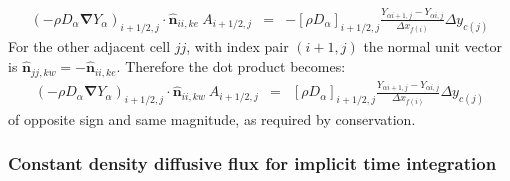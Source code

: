 \documentclass[12pt]{article}
\begin{document}
%
\begin{eqnarray}
   \left( - \rho D_\alpha \boldsymbol{\nabla} Y_\alpha \right)_{i+1/2,j} \cdot \hat{\mathbf{n}}_{ii,ke} \: A_{i+1/2,j} & = &  
   -[\rho D_\alpha]_{i+1/2,j} \frac{Y_{\alpha i+1,j}-Y_{ \alpha i,j}}{\Delta x_{f(i)}} \Delta y_{c(j)} \label{eq:diffii}
\end{eqnarray} 
%
For the other adjacent cell $jj$, with index pair $(i+1,j)$ the normal unit vector is $\hat{\mathbf{n}}_{jj,kw}=-\hat{\mathbf{n}}_{ii,ke}$. Therefore the dot product becomes:
%
\begin{eqnarray}
   \left( - \rho D_\alpha \boldsymbol{\nabla} Y_\alpha \right)_{i+1/2,j} \cdot \hat{\mathbf{n}}_{ii,kw} \: A_{i+1/2,j} & = &  
   [\rho D_\alpha]_{i+1/2,j} \frac{Y_{\alpha i+1,j}-Y_{ \alpha i,j}}{\Delta x_{f(i)}} \Delta y_{c(j)} \label{eq:diffjj}
\end{eqnarray} 
%
of opposite sign and same magnitude, as required by conservation.


\subsubsection*{Constant density diffusive flux for implicit time integration}
\end{document}
